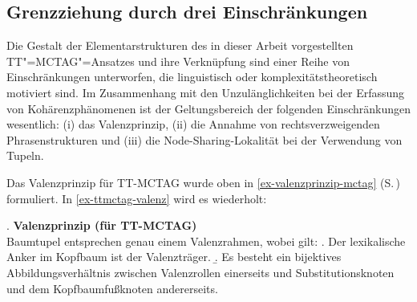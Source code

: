 \subsection{Grenzziehung durch drei Einschränkungen}

Die Gestalt der Elementarstrukturen des in dieser Arbeit vorgestellten TT"=MCTAG"=Ansatzes und ihre Verknüpfung sind einer Reihe von Einschränkungen unterworfen, die linguistisch oder komplexitätstheoretisch motiviert sind. Im Zusammenhang mit den Unzulänglichkeiten bei der Erfassung von Kohärenzphänomenen ist der Geltungsbereich der folgenden Einschränkungen wesentlich: (i) das Valenzprinzip, (ii) die Annahme von rechtsverzweigenden Phrasenstrukturen und (iii) die Node-Sharing-Lokalität bei der Verwendung von Tupeln. 


Das Valenzprinzip für TT-MCTAG wurde oben in \ref{ex-valenzprinzip-mctag} (S.\,\pageref{ex-valenzprinzip-mctag}) formuliert. In \ref{ex-ttmctag-valenz} wird es wiederholt:

\ex. \label{ex-ttmctag-valenz}{\bf Valenzprinzip (für TT-MCTAG)} \\ 
Baumtupel entsprechen genau einem Valenzrahmen, wobei gilt:
\a. Der lexikalische Anker im Kopfbaum ist der Valenzträger.
\b. Es besteht ein bijektives Abbildungsverhältnis zwischen Valenzrollen einerseits und Substitutionsknoten und dem Kopfbaumfu\ss knoten andererseits.


